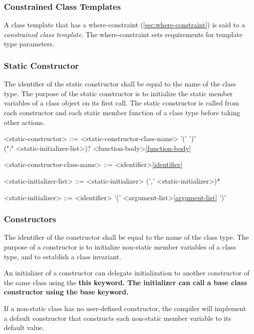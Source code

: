 \documentclass[a4paper,oneside,11pt]{article}
\begin{document}
\subsubsection{Constrained Class Templates}

A class template that has a where-constraint (\ref{sec:where-constraint}) is said to a \emph{constrained class template}.
The where-constraint sets requirements for template type parameters.

\subsubsection{Static Constructor}

The identifier of the static constructor shall be equal to the name of the class type.
The purpose of the static constructor is to initialize the static member variables of a class object on its first call.
The static constructor is called from each constructor and each static member function of a class type
before taking other actions.

\begin{grammar}
\label{static-constructor}<static-constructor> ::=  <static-constructor-class-name> '(' ')'\\
(":" <static-initializer-list>)? <function-body>\ref{function-body}

<static-constructor-class-name> ::= <identifier>\ref{identifier}

<static-initializer-list> ::= <static-initializer> (',' <static-initializer>)*

<static-initializer> ::= <identifier> '(' <argument-list>\ref{argument-list} ')'
\end{grammar}

\subsubsection{Constructors}

The identifier of the constructor shall be equal to the name of the class type.
The purpose of a constructor is to initialize non-static member variables of a class type,
and to establish a class invariant.

An initializer of a constructor can delegate initialization to another constructor of
the same class using the \bf{this} keyword.
The initializer can call a base class constructor using the \bf{base} keyword.

If a non-static class has no user-defined constructor, the compiler will implement a default constructor that constructs
each non-static member variable to its default value.
\end{document}
